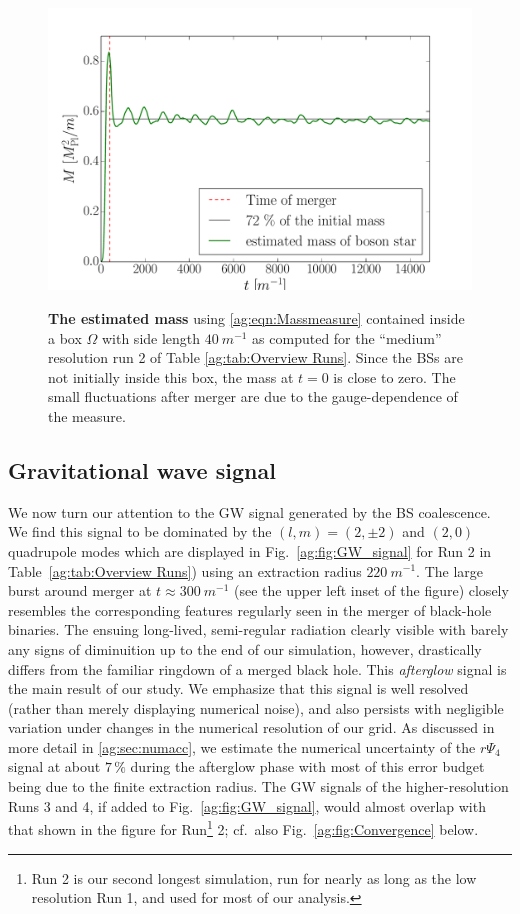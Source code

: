 \begin{figure}[h!]
\begin{center}
    {\includegraphics[width=0.7\columnwidth]{ag_fig/mass_over_time.pdf}}
    \caption{{\bf The estimated mass} using \ref{ag:eqn:Massmeasure}
    contained inside a box $\Omega$ with side length $40~m^{-1}$ as computed for the ``medium''
    resolution run 2 of Table \ref{ag:tab:Overview Runs}.
    Since the BSs are
    not initially inside this box, the mass at $t = 0$ is close to zero. The small fluctuations after merger
   are due to the gauge-dependence of the measure.
   }
\label{ag:fig:energy}
\end{center}
\end{figure}







\subsection{Gravitational wave signal}\label{ag:sec:GWs}



We now turn our attention to the GW signal generated by the
BS coalescence. We find this signal to be dominated by the
$(l,m)=(2,\pm 2)$ and $(2,0)$ quadrupole modes which are
displayed in Fig.~\ref{ag:fig:GW_signal} for Run 2 in Table~\ref{ag:tab:Overview Runs}) using an extraction
radius $220~m^{-1}$. The large burst around merger at $t\approx300~m^{-1}$ (see the upper left inset of the figure)
closely resembles the corresponding features
regularly seen in the merger of black-hole binaries.
The ensuing long-lived, semi-regular radiation clearly visible
with barely any signs of diminuition up to the end of our
simulation, however, drastically
differs from the familiar ringdown of a merged black hole. This
{\it afterglow} signal is the main result of our study. We
emphasize that this signal is well resolved (rather than
merely displaying numerical noise), and also persists with
negligible variation under changes in the numerical resolution
of our grid. As discussed in more detail in
\ref{ag:sec:numacc}, we estimate the numerical uncertainty
of the $r\Psi_4$ signal at about $7\,\%$ during the afterglow phase
with most of this error budget being due to the finite extraction radius.
The GW signals of the higher-resolution Runs 3 and 4, if added
to Fig.~\ref{ag:fig:GW_signal}, would almost overlap with
that shown in the figure for Run\footnote{Run 2 is our second longest simulation, run for nearly as long as the low resolution Run 1,
and used for most of our analysis.} 2;
cf.~also Fig.~\ref{ag:fig:Convergence} below.

